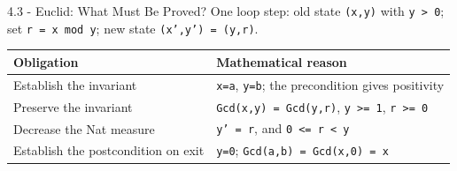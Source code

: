 \documentclass[aspectratio=169,11pt]{beamer}
\begin{document}
\begin{frame}[fragile,t]{4.3 - Euclid: What Must Be Proved?}
One loop step: old state \texttt{(x,y)} with \texttt{y > 0}; set \texttt{r = x mod y}; new state \texttt{(x',y') = (y,r)}.

\begin{footnotesize}
\setlength{\tabcolsep}{3pt}
\renewcommand{\arraystretch}{1.15}
\begin{tabularx}{\textwidth}{>{\raggedright\arraybackslash}X>{\raggedright\arraybackslash}X}
\toprule
\textbf{Obligation} & \textbf{Mathematical reason} \\
\midrule
Establish the invariant & \texttt{x=a}, \texttt{y=b}; the precondition gives positivity \\
Preserve the invariant & \texttt{Gcd(x,y) = Gcd(y,r)}, \texttt{y >= 1}, \texttt{r >= 0} \\
Decrease the Nat measure & \texttt{y' = r}, and \texttt{0 <= r < y} \\
Establish the postcondition on exit & \texttt{y=0}; \texttt{Gcd(a,b) = Gcd(x,0) = x} \\
\bottomrule
\end{tabularx}
\end{footnotesize}


\end{frame}
\end{document}
